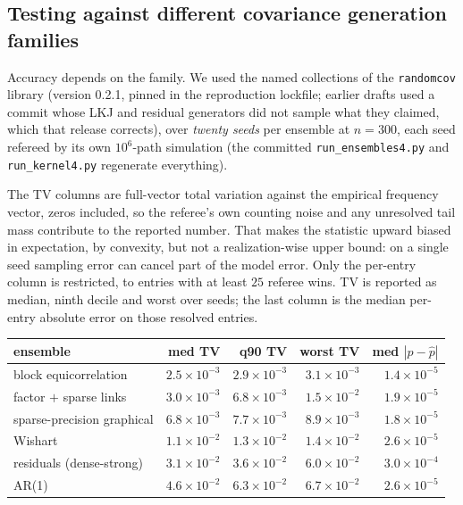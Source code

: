 \documentclass[11pt]{article}
\begin{document}
\subsection{Testing against different covariance generation families}\label{sec:ensembles}

Accuracy depends on the family. We used the named collections of the \texttt{randomcov} library
(version 0.2.1, pinned in the reproduction lockfile; earlier drafts used
a commit whose LKJ and residual generators did not sample what they
claimed, which that release corrects), over \emph{twenty seeds} per ensemble at $n=300$,
each seed refereed by its own $10^6$-path simulation (the committed
\texttt{run\_ensembles4.py} and \texttt{run\_kernel4.py} regenerate
everything).

The TV columns are full-vector total variation against the empirical
frequency vector, zeros included, so the referee's own counting noise and
any unresolved tail mass contribute to the reported number. That makes
the statistic upward biased in expectation, by convexity, but not a
realization-wise upper bound: on a single seed sampling error can cancel
part of the model error. Only the per-entry column is restricted, to
entries with at least $25$ referee wins. TV is reported as median, ninth
decile and worst over seeds; the last column is the median per-entry
absolute error on those resolved entries.

\begin{center}\small
\begin{tabular}{lrrrr}
\toprule
ensemble & med TV & q90 TV & worst TV & med $|p-\hat p|$\\
\midrule
block equicorrelation & $2.5\times10^{-3}$ & $2.9\times10^{-3}$ & $3.1\times10^{-3}$ & $1.4\times10^{-5}$\\
factor $+$ sparse links & $3.0\times10^{-3}$ & $6.8\times10^{-3}$ & $1.5\times10^{-2}$ & $1.9\times10^{-5}$\\
sparse-precision graphical & $6.8\times10^{-3}$ & $7.7\times10^{-3}$ & $8.9\times10^{-3}$ & $1.8\times10^{-5}$\\
Wishart & $1.1\times10^{-2}$ & $1.3\times10^{-2}$ & $1.4\times10^{-2}$ & $2.6\times10^{-5}$\\
residuals (dense-strong) & $3.1\times10^{-2}$ & $3.6\times10^{-2}$ & $6.0\times10^{-2}$ & $3.0\times10^{-4}$\\
AR(1) & $4.6\times10^{-2}$ & $6.3\times10^{-2}$ & $6.7\times10^{-2}$ & $2.6\times10^{-5}$\\
\bottomrule
\end{tabular}
\end{center}
\end{document}
